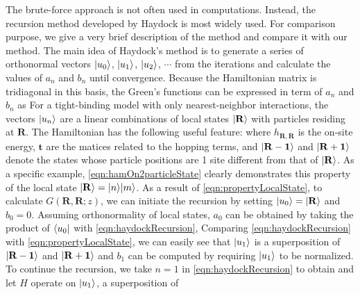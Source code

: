 The brute-force approach is not often used in computations. Instead, the recursion method developed by Haydock 
\cite{haydock1972, haydock1975} is most widely used. For comparison purpose, we give a very brief description of the
method and compare it with our method.  The main idea of Haydock's method is to generate a series of orthonormal
vectors $| u_0 \rangle$, $| u_1 \rangle$, $| u_2 \rangle$, $\cdots$ from the iterations
and calculate the values of $a_n$ and $b_n$ until convergence. 
Because the Hamiltonian matrix is tridiagonal in this basis, the Green's functions can be expressed in 
term of $a_n$ and $b_n$ as
For a tight-binding model with only nearest-neighbor 
interactions, the vectors $| u_n \rangle$ are a linear combinations of local states $| \mathbf{R} \rangle$ with particles residing at 
$\mathbf{R}$. The Hamiltonian has the following useful feature:
where $h_{\mathbf{R}, \mathbf{R}}$ is the on-site energy, $\mathbf{t}$ are the matices related to the hopping terms, and 
$|  \mathbf{R-1} \rangle$ and $|  \mathbf{R+1} \rangle$ denote the states whose particle 
positions are 1 site  different from that of $|  \mathbf{R} \rangle$. As a specific example, 
\autoref{eqn:hamOn2particleState} clearly demonstrates this property of the local state $|  \mathbf{R} \rangle = 
| n \rangle| m \rangle$. As a result of \autoref{eqn:propertyLocalState}, to calculate $G(\mathbf{R}, \mathbf{R}; z)$, 
we can initiate the recursion by setting $| u_0 \rangle = | \mathbf{R} \rangle$ and $b_0 = 0$. Assuming orthonormality of 
local states, $a_0$ can be obtained by taking the product of $\langle u_0 |$ with \autoref{eqn:haydockRecursion},
Comparing \autoref{eqn:haydockRecursion} with \autoref{eqn:propertyLocalState}, we can easily see that 
 $| u_1 \rangle$ is a superposition of $|  \mathbf{R-1} \rangle$ and $|  \mathbf{R+1} \rangle$ and $b_1$ can be 
computed by requiring $| u_1 \rangle$ to be normalized. To continue the recursion, we take
$n=1$ in \autoref{eqn:haydockRecursion} to obtain
and let $H$ operate on $| u_1 \rangle$, a superposition of  

